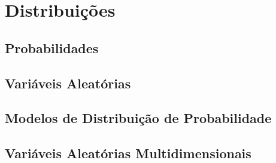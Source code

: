 \documentclass[11pt, openany]{book}
\begin{document}
\maketitle

\frontmatter

\tableofcontents

\mainmatter



\part{Distribuições}

\chapter{Probabilidades}







\chapter{Variáveis Aleatórias}









% 

\chapter{Modelos de Distribuição de Probabilidade}





% 
% 

\chapter{Variáveis Aleatórias Multidimensionais}
\end{document}
